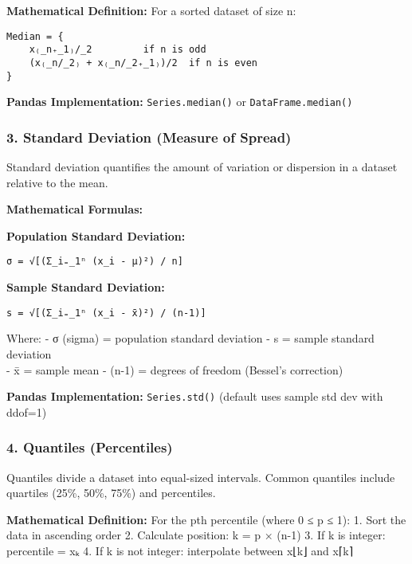 \documentclass[11pt]{article}
\begin{document}
\textbf{Mathematical Definition:} For a sorted dataset of size n:

\begin{verbatim}
Median = {
    x₍_n₊_1₎/_2         if n is odd
    (x₍_n/_2₎ + x₍_n/_2₊_1₎)/2  if n is even
}
\end{verbatim}

\textbf{Pandas Implementation:} \texttt{Series.median()} or
\texttt{DataFrame.median()}

\subsubsection{\texorpdfstring{3. \textbf{Standard Deviation (Measure of
Spread)}}{3. Standard Deviation (Measure of Spread)}}\label{standard-deviation-measure-of-spread}

Standard deviation quantifies the amount of variation or dispersion in a
dataset relative to the mean.

\textbf{Mathematical Formulas:}

\textbf{Population Standard Deviation:}

\begin{verbatim}
σ = √[(Σ_i₌_1ⁿ (x_i - μ)²) / n]
\end{verbatim}

\textbf{Sample Standard Deviation:}

\begin{verbatim}
s = √[(Σ_i₌_1ⁿ (x_i - x̄)²) / (n-1)]
\end{verbatim}

Where: - σ (sigma) = population standard deviation - s = sample standard
deviation\\
- x̄ = sample mean - (n-1) = degrees of freedom (Bessel's correction)

\textbf{Pandas Implementation:} \texttt{Series.std()} (default uses
sample std dev with ddof=1)

\subsubsection{\texorpdfstring{4. \textbf{Quantiles
(Percentiles)}}{4. Quantiles (Percentiles)}}\label{quantiles-percentiles}

Quantiles divide a dataset into equal-sized intervals. Common quantiles
include quartiles (25\%, 50\%, 75\%) and percentiles.

\textbf{Mathematical Definition:} For the pth percentile (where 0 ≤ p ≤
1): 1. Sort the data in ascending order 2. Calculate position: k = p ×
(n-1) 3. If k is integer: percentile = xₖ 4. If k is not integer:
interpolate between x⌊k⌋ and x⌈k⌉
\end{document}
